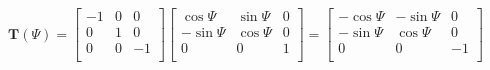 \begin{equation}
  \boldsymbol T \left( \Psi \right)
  =
  \left[
    \begin{matrix}
      -1 & 0 &  0 \\
       0 & 1 &  0 \\
       0 & 0 & -1 \\
    \end{matrix}
  \right]
  \left[
    \begin{matrix}
       \cos \Psi & \sin \Psi & 0 \\
      -\sin \Psi & \cos \Psi & 0 \\
               0 &         0 & 1 \\
    \end{matrix}
  \right]
  =
  \left[
    \begin{matrix}
      -\cos \Psi & -\sin \Psi &  0 \\
      -\sin \Psi &  \cos \Psi &  0 \\
               0 &          0 & -1 \\
    \end{matrix}
  \right]
\end{equation}
